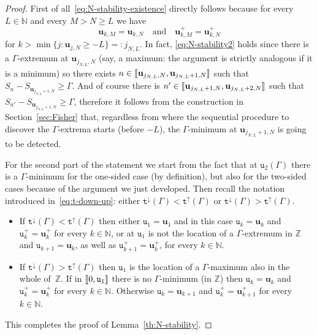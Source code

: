 \documentclass[10pt]{amsart}
\theoremstyle{definition}\newtheorem{defi}[theo]{Definition}\newtheorem{rema}[theo]{Remark}\newtheorem{exam}[theo]{Example}\newtheorem{exem}[theo]{Example}\newtheorem{nota}[theo]{Notation}
\newcommand{\bfu}{\mathbf{u}}
\newcommand{\bbN}{\mathbb{N}}
\newcommand{\bbZ}{\mathbb{Z}}
\newcommand{\gG}{\Gamma}
\renewcommand*\ss{\mathtt{u}}
\newcommand{\ttt}{\mathtt{t}}
\newcommand{\tu}{\ss}
\newcommand{\llbracket}{\mathopen{[\mkern -2.7mu[}}
\newcommand{\rrbracket}{\mathclose{]\mkern -2.7mu]}}
\newcommand{\lbra}{\llbracket}
\newcommand{\rbra}{\rrbracket}
\begin{document}
\begin{proof}
First of all~\eqref{eq:N-stability-existence} directly follows because for every $L \in \bbN$ and every $M> N \ge L$ we have
\begin{equation}\label{eq:N-stability2}
\bfu_{k, M}= \bfu_{k, N}
\quad\text{and}\quad \bfu^+_{k, M}= \bfu^+_{k, N}
\end{equation}
for $k> \min\{j: \bfu_{j, N}\ge -L\}=: j_{N,L}$. In fact, \eqref{eq:N-stability2} holds since there is a $\gG$-extremum at $\bfu_{j_{N, L}, N}$ (say, a maximum: the argument is strictly analogous if it is a minimum) so there exists $n\in \lbra \bfu_{j_{N, L}, N}, \bfu_{j_{N, L}+1, N}\rbra$ such that $S_n-S_{ \bfu_{j_{N, L}+1, N}}\ge \gG$. And of course there is $n'\in \lbra \bfu_{j_{N, L}+1, N}, \bfu_{j_{N, L}+2, N}\rbra$ such that $S_{n'}-S_{ \bfu_{j_{N, L}+1, N}}\ge \gG$, therefore it follows from the construction in Section~\ref{sec:Fisher} that, regardless from where the sequential procedure to discover the $\gG$-extrema starts (before $-L$), the $\gG$-minimum at $\bfu_{j_{N, L}+1, N}$ is going to be detected.

For the second part of the statement we start from the fact that at $\tu_2(\gG)$ there is a $\gG$-minimum for the one-sided case (by definition), but also for the two-sided cases because of the argument we just developed. Then recall the notation introduced in~\eqref{eq:t-down-up}: either $\ttt^\downarrow(\gG)< \ttt^\uparrow(\gG)$ or $\ttt^\downarrow(\gG)> \ttt^\uparrow(\gG)$.
\begin{itemize}
\item If $\ttt^\downarrow(\gG)< \ttt^\uparrow(\gG)$ then either $\ss_1 =\bfu_1$ and in this case $\ss_k=\bfu_k$ and $\ss^+_k=\bfu^+_k$ for every $k \in \bbN$, or at $\ss_1$ is not the location of a $\gG$-extremum in $\bbZ$ and $\ss_{k+1}=\bfu_k$, as well as $\ss^+_{k+1}=\bfu^+_k$, for every $k \in \bbN$.
\item If $\ttt^\downarrow(\gG)> \ttt^\uparrow(\gG)$ then $\ss_1$ is the location of a $\gG$-maximum also in the whole of~$\bbZ$. If in $\lbra0, \ss_1\rbra$ there is no $\gG$-minimum (in $\bbZ$) then $\ss_k=\bfu_k$ and $\ss^+_k=\bfu^+_k$ for every $k \in \bbN$. Otherwise $\ss_k=\bfu_{k+1}$ and $\ss^+_k=\bfu^+_{k+1}$ for every $k \in \bbN$.
\end{itemize}


This completes the proof of Lemma~\ref{th:N-stability}.
\end{proof}
\end{document}
